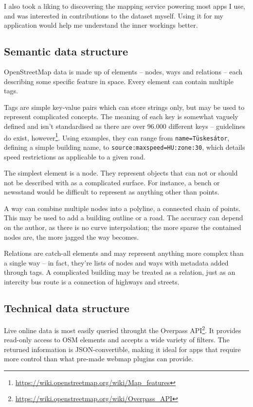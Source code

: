 I also took a liking to discovering the mapping service powering most apps I use, and was interested in contributions to the dataset myself. Using it for my application would help me understand the inner workings better.

\subsection{Semantic data structure}

OpenStreetMap data is made up of elements -- nodes, ways and relations -- each describing some specific feature in space. Every element can contain multiple tags.~\cite{osmElements}

Tags are simple key-value pairs which can store strings only, but may be used to represent complicated concepts. The meaning of each key is somewhat vaguely defined and isn't standardised as there are over 96.000 different keys -- guidelines do exist, however\footnote{\url{https://wiki.openstreetmap.org/wiki/Map_features}}. Using examples, they can range from \verb|name=Tüskesátor|, defining a simple building name, to \verb|source:maxspeed=HU:zone:30|, which details speed restrictions as applicable to a given road.

The simplest element is a node. They represent objects that can not or should not be described with as a complicated surface. For instance, a bench or newsstand would be difficult to represent as anything other than points. 

A way can combine multiple nodes into a polyline, a connected chain of points. This may be used to add a building outline or a road. The accuracy can depend on the author, as there is no curve interpolation; the more sparse the contained nodes are, the more jagged the way becomes.

Relations are catch-all elements and may represent anything more complex than a single way -- in fact, they're lists of nodes and ways with metadata added through tags. A complicated building may be treated as a relation, just as an intercity bus route is a connection of highways and streets.

\subsection{Technical data structure}

Live online data is most easily queried throught the Overpass API\footnote{\url{https://wiki.openstreetmap.org/wiki/Overpass_API}}. It provides read-only access to OSM elements and accepts a wide variety of filters. The returned information is JSON-convertible, making it ideal for apps that require more control than what pre-made webmap plugins can provide.

